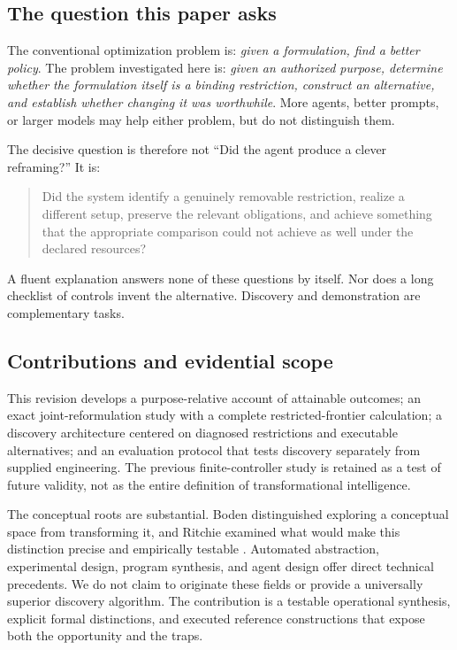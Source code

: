 \documentclass[11pt,letterpaper]{article}
\theoremstyle{remark}\newtheorem{remark}{Remark}[section]
\begin{document}
\subsection{The question this paper asks}
The conventional optimization problem is: \emph{given a formulation, find a better policy}. The problem investigated here is: \emph{given an authorized purpose, determine whether the formulation itself is a binding restriction, construct an alternative, and establish whether changing it was worthwhile}. More agents, better prompts, or larger models may help either problem, but do not distinguish them.

The decisive question is therefore not ``Did the agent produce a clever reframing?'' It is:
\begin{quote}
Did the system identify a genuinely removable restriction, realize a different setup, preserve the relevant obligations, and achieve something that the appropriate comparison could not achieve as well under the declared resources?
\end{quote}
A fluent explanation answers none of these questions by itself. Nor does a long checklist of controls invent the alternative. Discovery and demonstration are complementary tasks.

\subsection{Contributions and evidential scope}
This revision develops a purpose-relative account of attainable outcomes; an exact joint-reformulation study with a complete restricted-frontier calculation; a discovery architecture centered on diagnosed restrictions and executable alternatives; and an evaluation protocol that tests discovery separately from supplied engineering. The previous finite-controller study is retained as a test of future validity, not as the entire definition of transformational intelligence.

The conceptual roots are substantial. Boden distinguished exploring a conceptual space from transforming it, and Ritchie examined what would make this distinction precise and empirically testable \citep{boden1998,ritchie2006}. Automated abstraction, experimental design, program synthesis, and agent design offer direct technical precedents. We do not claim to originate these fields or provide a universally superior discovery algorithm. The contribution is a testable operational synthesis, explicit formal distinctions, and executed reference constructions that expose both the opportunity and the traps.
\end{document}
